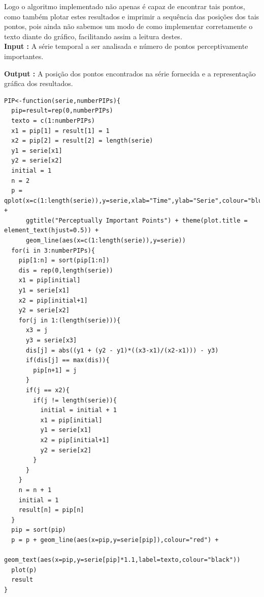 \documentclass[12pt,letterpaper]{article}
\begin{document}
Logo o algoritmo implementado não apenas é capaz de encontrar tais pontos, como também plotar estes resultados e imprimir a sequência das posições dos tais pontos, pois ainda não sabemos um modo de como implementar corretamente o texto diante do gráfico, facilitando assim a leitura destes.\\

\textbf{Input :} A série temporal a ser analisada e número de pontos perceptivamente importantes.

\textbf{Output :} A posição dos pontos encontrados na série fornecida e a representação gráfica dos resultados.\\

\begin{lstlisting}
PIP<-function(serie,numberPIPs){ 
  pip=result=rep(0,numberPIPs) 
  texto = c(1:numberPIPs)
  x1 = pip[1] = result[1] = 1
  x2 = pip[2] = result[2] = length(serie)
  y1 = serie[x1]
  y2 = serie[x2]
  initial = 1 
  n = 2 
  p = qplot(x=c(1:length(serie)),y=serie,xlab="Time",ylab="Serie",colour="blue") +
      ggtitle("Perceptually Important Points") + theme(plot.title = element_text(hjust=0.5)) +
      geom_line(aes(x=c(1:length(serie)),y=serie))
  for(i in 3:numberPIPs){
    pip[1:n] = sort(pip[1:n])
    dis = rep(0,length(serie))
    x1 = pip[initial]
    y1 = serie[x1]
    x2 = pip[initial+1]
    y2 = serie[x2]
    for(j in 1:(length(serie))){
      x3 = j
      y3 = serie[x3]
      dis[j] = abs((y1 + (y2 - y1)*((x3-x1)/(x2-x1))) - y3)
      if(dis[j] == max(dis)){
        pip[n+1] = j
      }
      if(j == x2){
        if(j != length(serie)){
          initial = initial + 1 
          x1 = pip[initial]
          y1 = serie[x1]
          x2 = pip[initial+1]
          y2 = serie[x2]
        }
      }
    }
    n = n + 1
    initial = 1
    result[n] = pip[n]
  }
  pip = sort(pip)
  p = p + geom_line(aes(x=pip,y=serie[pip]),colour="red") +
      geom_text(aes(x=pip,y=serie[pip]*1.1,label=texto,colour="black"))
  plot(p)
  result 
}
\end{lstlisting}
\end{document}
